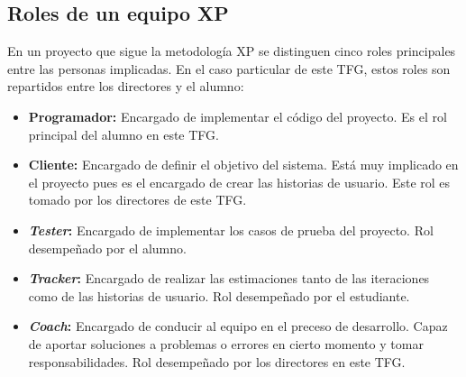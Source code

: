\subsection{Roles de un equipo XP}
En un proyecto que sigue la metodología \gls{XP} se distinguen cinco roles principales entre las personas implicadas. En el caso particular de este \gls{TFG}, estos roles son repartidos entre los directores y el alumno:
\begin{itemize}
\item \textbf{Programador:} Encargado de implementar el código del proyecto. Es el rol principal del alumno en este \gls{TFG}.
\item \textbf{Cliente:} Encargado de definir el objetivo del sistema. Está muy implicado en el proyecto pues es el encargado de crear las historias de usuario. Este rol es tomado por los directores de este \gls{TFG}.
\item \textbf{\textit{Tester}:} Encargado de implementar los casos de prueba del proyecto. Rol desempeñado por el alumno.
\item \textbf{\textit{Tracker}:} Encargado de realizar las estimaciones tanto de las iteraciones como de las historias de usuario. Rol desempeñado por el estudiante.
  \item \textbf{\textit{Coach}:} Encargado de conducir al equipo en el preceso de desarrollo. Capaz de aportar soluciones a problemas o errores en cierto momento y tomar responsabilidades. Rol desempeñado por los directores en este \gls{TFG}.

\end{itemize}
